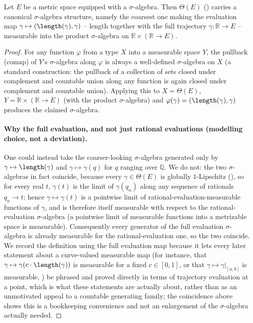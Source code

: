 \begin{lemma}
  Let $E$ be a metric space equipped with a $\sigma$-algebra. Then $\Theta(E)$
  () carries a canonical $\sigma$-algebra structure, namely the coarsest one making
  the evaluation map $\gamma \mapsto (\length(\gamma), \gamma)$ -- length together with the full
  trajectory $\gamma \colon \mathbb{R} \to E$ -- measurable into the product $\sigma$-algebra on
  $\mathbb{R} \times (\mathbb{R} \to E)$.
\end{lemma}
\begin{proof}
  For any function $\varphi$ from a type $X$ into a measurable space $Y$, the pullback
  ($\mathrm{comap}$) of $Y$'s $\sigma$-algebra along $\varphi$ is always a well-defined
  $\sigma$-algebra on $X$ (a standard construction: the pullback of a collection of sets closed
  under complement and countable union along any function is again closed under complement and
  countable union). Applying this to $X = \Theta(E)$, $Y = \mathbb{R} \times (\mathbb{R} \to E)$
  (with the product $\sigma$-algebra) and $\varphi(\gamma) = (\length(\gamma), \gamma)$ produces the
  claimed $\sigma$-algebra.

  \paragraph{Why the full evaluation, and not just rational evaluations (modelling choice, not a
  deviation).} One could instead take the coarser-looking $\sigma$-algebra generated only by
  $\gamma \mapsto \length(\gamma)$ and $\gamma \mapsto \gamma(q)$ for $q$ ranging over $\mathbb{Q}$.
  We do not: the two $\sigma$-algebras in fact coincide, because every $\gamma \in \Theta(E)$ is
  globally $1$-Lipschitz (), so for every real $t$, $\gamma(t)$ is the limit
  of $\gamma(q_n)$ along any sequence of rationals $q_n \to t$; hence $\gamma \mapsto \gamma(t)$ is a
  pointwise limit of rational-evaluation-measurable functions of $\gamma$, and is therefore itself
  measurable with respect to the rational-evaluation $\sigma$-algebra (a pointwise limit of
  measurable functions into a metrizable space is measurable). Consequently every generator of the
  full evaluation $\sigma$-algebra is already measurable for the rational-evaluation one, so the two
  coincide. We record the definition using the full evaluation map because it lets every later
  statement about a curve-valued measurable map (for instance, that $\gamma \mapsto \gamma(c \cdot
  \length(\gamma))$ is measurable for a fixed $c\in[0,1]$, or that $\gamma \mapsto \gamma|_{[a,b]}$ is
  measurable, ) be phrased and proved directly in terms of trajectory
  evaluation at a point, which is what these statements are actually about, rather than as an
  unmotivated appeal to a countable generating family; the coincidence above shows this is a
  bookkeeping convenience and not an enlargement of the $\sigma$-algebra actually needed.


\end{proof}
